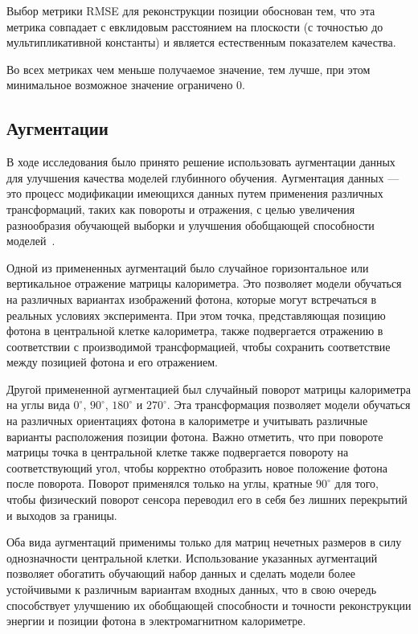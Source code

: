 \documentclass[a4paper,12pt]{extarticle}
\begin{document}
Выбор метрики \textsf{RMSE} для реконструкции позиции обоснован тем, что эта метрика совпадает с евклидовым расстоянием на плоскости (с точностью до мультипликативной константы) и является естественным показателем качества.

Во всех метриках чем меньше получаемое значение, тем лучше, при этом минимальное возможное значение ограничено $0$.

\subsection{Аугментации}
\label{subsection:augmentations}

В ходе исследования было принято решение использовать аугментации данных для улучшения качества моделей глубинного обучения. Аугментация данных --- это процесс модификации имеющихся данных путем применения различных трансформаций, таких как повороты и отражения, с целью увеличения разнообразия обучающей выборки и улучшения обобщающей способности моделей~\cite{perez2017effectiveness}.

Одной из примененных аугментаций было случайное горизонтальное или вертикальное отражение матрицы калориметра. Это позволяет модели обучаться на различных вариантах изображений фотона, которые могут встречаться в реальных условиях эксперимента. При этом точка, представляющая позицию фотона в центральной клетке калориметра, также подвергается отражению в соответствии с производимой трансформацией, чтобы сохранить соответствие между позицией фотона и его отражением.

Другой примененной аугментацией был случайный поворот матрицы калориметра на углы вида $0^{\circ}$, $90^{\circ}$, $180^{\circ}$ и $270^{\circ}$. Эта трансформация позволяет модели обучаться на различных ориентациях фотона в калориметре и учитывать различные варианты расположения позиции фотона. Важно отметить, что при повороте матрицы точка в центральной клетке также подвергается повороту на соответствующий угол, чтобы корректно отобразить новое положение фотона после поворота. Поворот применялся только на углы, кратные $90^{\circ}$ для того, чтобы физический поворот сенсора переводил его в себя без лишних перекрытий и выходов за границы.

Оба вида аугментаций применимы только для матриц нечетных размеров в силу однозначности центральной клетки. Использование указанных аугментаций позволяет обогатить обучающий набор данных и сделать модели более устойчивыми к различным вариантам входных данных, что в свою очередь способствует улучшению их обобщающей способности и точности реконструкции энергии и позиции фотона в электромагнитном калориметре.
\end{document}
